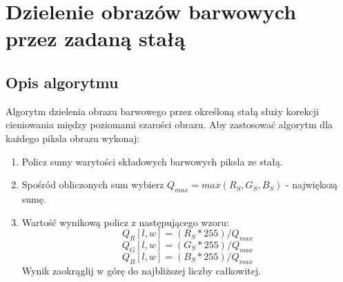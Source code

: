 \documentclass[a4paper,12pt, titlepage]{report}
\begin{document}
\section{Dzielenie obrazów barwowych przez zadaną stałą}
\subsection*{Opis algorytmu}
\par Algorytm dzielenia obrazu barwowego przez określoną stałą służy korekcji cieniowania między poziomami szarości obrazu. Aby zastosować algorytm dla każdego piksla obrazu wykonaj:
\begin{enumerate}
\item Policz sumy warytości składowych barwowych piksla ze stałą.
\item Spośród obliczonych sum wybierz \(Q_{max}=max(R_{S},G_{S},B_{S})\) - największą sumę.
\item Wartość wynikową policz z następującego wzoru: \[Q_{R}[l,w]=(R_{S}*255)/Q_{max}\]\[Q_{G}[l,w]=(G_{S}*255)/Q_{max}\]\[Q_{B}[l,w]=(B_{S}*255)/Q_{max}\]Wynik zaokrąglij w górę do najbliższej liczby całkowitej.
\end{enumerate}
\end{document}
